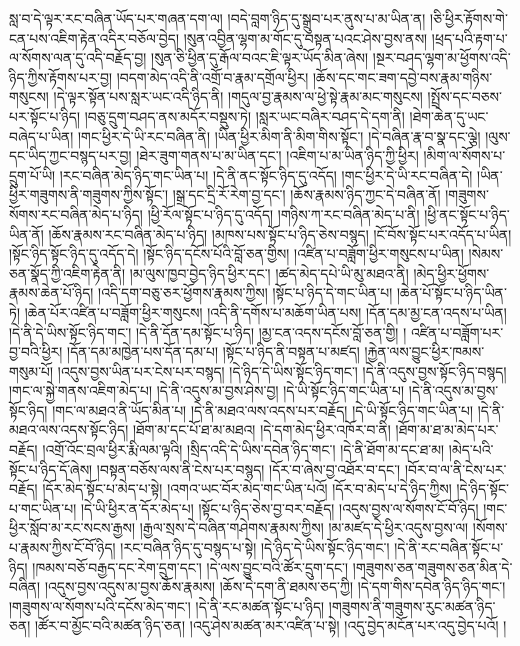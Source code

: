 སླ་བ་དེ་ལྟར་རང་བཞིན་ཡོད་པར་གཞན་དག་ལ། །བདེ་བླག་ཉིད་དུ་སྒྲུབ་པར་ནུས་པ་མ་ཡིན་ན། །ཅི་ཕྱིར་རྟོགས་གེ་ངན་པས་འཇིག་རྟེན་འདིར་བཅོལ་བྱེད། །སུན་འབྱིན་ལྷག་མ་གོང་དུ་བསྟན་པའང་ཤེས་བྱས་ནས། །ཕྲད་པའི་རྟག་པ་ལ་སོགས་ལན་དུ་འདི་བརྗོད་བྱ། །སུན་ཅི་ཕྱིན་དུ་རྒོལ་བའང་ཇི་ལྟར་ཡོད་མིན་ཞེས། །སྔར་བཤད་ལྷག་མ་ཕྱོགས་འདི་ཉིད་ཀྱིས་རྟོགས་པར་བྱ། །བདག་མེད་འདི་ནི་འགྲོ་བ་རྣམ་དགྲོལ་ཕྱིར། །ཆོས་དང་གང་ཟག་དབྱེ་བས་རྣམ་གཉིས་གསུངས། །དེ་ལྟར་སྟོན་པས་སླར་ཡང་འདི་ཉིད་ནི། །གདུལ་བྱ་རྣམས་ལ་ཕྱེ་སྟེ་རྣམ་མང་གསུངས། །སྤྲོས་དང་བཅས་པར་སྟོང་པ་ཉིད། །བཅུ་དྲུག་བཤད་ནས་མདོར་བསྡུས་ཏེ། །སླར་ཡང་བཞིར་བཤད་དེ་དག་ནི། །ཐེག་ཆེན་དུ་ཡང་བཞེད་པ་ཡིན། །གང་ཕྱིར་དེ་ཡི་རང་བཞིན་ནི། །ཡིན་ཕྱིར་མིག་ནི་མིག་གིས་སྟོང་། །དེ་བཞིན་རྣ་བ་སྣ་དང་ལྕེ། །ལུས་དང་ཡིད་ཀྱང་བསྙད་པར་བྱ། །ཐེར་ཟུག་གནས་པ་མ་ཡིན་དང་། །འཇིག་པ་མ་ཡིན་ཉིད་ཀྱི་ཕྱིར། །མིག་ལ་སོགས་པ་དྲུག་པོ་ཡི། །རང་བཞིན་མེད་ཉིད་གང་ཡིན་པ། །དེ་ནི་ནང་སྟོང་ཉིད་དུ་འདོད། །གང་ཕྱིར་དེ་ཡི་རང་བཞིན་དེ། །ཡིན་ཕྱིར་གཟུགས་ནི་གཟུགས་ཀྱིས་སྟོང་། །སྒྲ་དང་དྲི་རོ་རེག་བྱ་དང་། །ཆོས་རྣམས་ཉིད་ཀྱང་དེ་བཞིན་ནོ། །གཟུགས་སོགས་རང་བཞིན་མེད་པ་ཉིད། །ཕྱི་རོལ་སྟོང་པ་ཉིད་དུ་འདོད། །གཉིས་ཀ་རང་བཞིན་མེད་པ་ནི། །ཕྱི་ནང་སྟོང་པ་ཉིད་ཡིན་ནོ། །ཆོས་རྣམས་རང་བཞིན་མེད་པ་ཉིད། །མཁས་པས་སྟོང་པ་ཉིད་ཅེས་བསྙད། །ངོ་བོས་སྟོང་པར་འདོད་པ་ཡིན། །སྟོང་ཉིད་སྟོང་ཉིད་དུ་འདོད་དེ། །སྟོང་ཉིད་དངོས་པོའི་བློ་ཅན་གྱིས། །འཛིན་པ་བཟློག་ཕྱིར་གསུངས་པ་ཡིན། །སེམས་ཅན་སྣོད་ཀྱི་འཇིག་རྟེན་ནི། །མ་ལུས་ཁྱབ་བྱེད་ཉིད་ཕྱིར་དང་། །ཚད་མེད་དཔེ་ཡི་མུ་མཐའ་ནི། །མེད་ཕྱིར་ཕྱོགས་རྣམས་ཆེན་པོ་ཉིད། །འདི་དག་བཅུ་ཅར་ཕྱོགས་རྣམས་ཀྱིས། །སྟོང་པ་ཉིད་དེ་གང་ཡིན་པ། །ཆེན་པོ་སྟོང་པ་ཉིད་ཡིན་ཏེ། །ཆེན་པོར་འཛིན་པ་བཟློག་ཕྱིར་གསུངས། །འདི་ནི་དགོས་པ་མཆོག་ཡིན་པས། །དོན་དམ་མྱ་ངན་འདས་པ་ཡིན། །དེ་ནི་དེ་ཡིས་སྟོང་ཉིད་གང་། །དེ་ནི་དོན་དམ་སྟོང་པ་ཉིད། །མྱ་ངན་འདས་དངོས་བློ་ཅན་གྱི། །
འཛིན་པ་བཟློག་པར་བྱ་བའི་ཕྱིར། །དོན་དམ་མཁྱེན་པས་དོན་དམ་པ། །སྟོང་པ་ཉིད་ནི་བསྟན་པ་མཛད། །རྐྱེན་ལས་བྱུང་ཕྱིར་ཁམས་གསུམ་པོ། །འདུས་བྱས་ཡིན་པར་ངེས་པར་བསྙད། །དེ་ཉིད་དེ་ཡིས་སྟོང་ཉིད་གང་། །དེ་ནི་འདུས་བྱས་སྟོང་ཉིད་བསྙད། །གང་ལ་སྐྱེ་གནས་འཇིག་མེད་པ། །དེ་ནི་འདུས་མ་བྱས་ཤེས་བྱ། །དེ་ཡི་སྟོང་ཉིད་གང་ཡིན་པ། །དེ་ནི་འདུས་མ་བྱས་སྟོང་ཉིད། །གང་ལ་མཐའ་ནི་ཡོད་མིན་པ། །དེ་ནི་མཐའ་ལས་འདས་པར་བརྗོད། །དེ་ཡི་སྟོང་ཉིད་གང་ཡིན་པ། །དེ་ནི་མཐའ་ལས་འདས་སྟོང་ཉིད། །ཐོག་མ་དང་པོ་ཐ་མ་མཐའ། །དེ་དག་མེད་ཕྱིར་འཁོར་བ་ནི། །ཐོག་མ་ཐ་མ་མེད་པར་བརྗོད། །འགྲོ་འོང་བྲལ་ཕྱིར་རྨི་ལམ་ལྟའི། །སྲིད་འདི་དེ་ཡིས་དབེན་ཉིད་གང་། །དེ་ནི་ཐོག་མ་དང་ཐ་མ། །མེད་པའི་སྟོང་པ་ཉིད་དོ་ཞེས། །བསྟན་བཅོས་ལས་ནི་ངེས་པར་བསྙད། །དོར་བ་ཞེས་བྱ་འཐོར་བ་དང་། །བོར་བ་ལ་ནི་ངེས་པར་བརྗོད། །དོར་མེད་སྟོང་པ་མེད་པ་སྟེ། །འགའ་ཡང་བོར་མེད་གང་ཡིན་པའོ། །དོར་བ་མེད་པ་དེ་ཉིད་ཀྱིས། །དེ་ཉིད་སྟོང་པ་གང་ཡིན་པ། །དེ་ཡི་ཕྱིར་ན་དོར་མེད་པ། །སྟོང་པ་ཉིད་ཅེས་བྱ་བར་བརྗོད། །འདུས་བྱས་ལ་སོགས་ངོ་བོ་ཉིད། །གང་ཕྱིར་སློབ་མ་རང་སངས་རྒྱས། །རྒྱལ་སྲས་དེ་བཞིན་གཤེགས་རྣམས་ཀྱིས། །མ་མཛད་དེ་ཕྱིར་འདུས་བྱས་ལ། །སོགས་པ་རྣམས་ཀྱིས་ངོ་བོ་ཉིད། །རང་བཞིན་ཉིད་དུ་བསྙད་པ་སྟེ། །དེ་ཉིད་དེ་ཡིས་སྟོང་ཉིད་གང་། །དེ་ནི་རང་བཞིན་སྟོང་པ་ཉིད། །ཁམས་བཅོ་བརྒྱད་དང་རེག་དྲུག་དང་། །དེ་ལས་བྱུང་བའི་ཚོར་དྲུག་དང་། །གཟུགས་ཅན་གཟུགས་ཅན་མིན་དེ་བཞིན། །འདུས་བྱས་འདུས་མ་བྱས་ཆོས་རྣམས། །ཆོས་དེ་དག་ནི་ཐམས་ཅད་ཀྱི། །དེ་དག་གིས་དབེན་ཉིད་ཉིད་གང་། །གཟུགས་ལ་སོགས་པའི་དངོས་མེད་གང་། །དེ་ནི་རང་མཚན་སྟོང་པ་ཉིད། །གཟུགས་ནི་གཟུགས་རུང་མཚན་ཉིད་ཅན། །ཚོར་བ་མྱོང་བའི་མཚན་ཉིད་ཅན། །འདུ་ཤེས་མཚན་མར་འཛིན་པ་སྟེ། །འདུ་བྱེད་མངོན་པར་འདུ་བྱེད་པའོ། །
